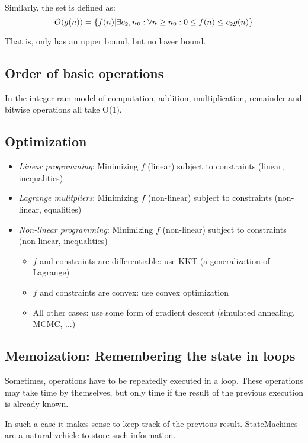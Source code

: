 Similarly, the set  is defined as: 
$$ O(g(n)) = \{ f(n) | \exists c_2, n_0 : \forall n \geq n_0:  0 \leq  f(n) \leq c_2 g(n) \} $$

That is, \BigOh{} only has an upper bound, but no lower bound.


\subsection{Order of basic operations}

In the integer ram model of computation, addition, multiplication, remainder and bitwise operations all take O(1).



\subsection{Optimization}

\begin{itemize}
  \item \emph{Linear programming}: Minimizing $f$ (linear) subject to constraints (linear, inequalities)
  \item \emph{Lagrange mulitpliers}: Minimizing $f$ (non-linear) subject to constraints (non-linear, equalities)
  \item \emph{Non-linear programming}: Minimizing $f$ (non-linear) subject to constraints (non-linear, inequalities)
  \begin{itemize}
    \item $f$ and constraints are differentiable: use KKT (a generalization of Lagrange)
    \item $f$ and constraints are convex: use convex optimization
    \item All other cases: use some form of gradient descent (simulated annealing, MCMC, ...)
  \end{itemize}
\end{itemize}



\subsection{Memoization: Remembering the state in loops}
Sometimes, operations have to be repeatedly executed in a loop. These operations may take  time by themselves, but only  time if the result of the previous execution is already known. 

In such a case it makes sense to keep track of the previous result. StateMachines are a natural vehicle to store such information. 

